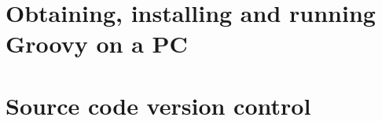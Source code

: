 \documentclass[11pt,a4paper]{book}
\begin{document}
% 
%



%


\appendix

\chapter{Obtaining, installing and running Groovy on a PC}
\label{sec:obta-inst-runn}


\chapter{Source code version control}
\label{sec:source-code-version}

\end{document}
